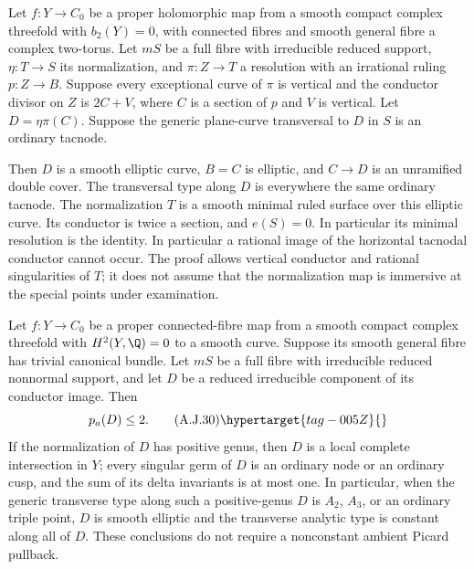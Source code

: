 
\begin{proposition}\hypertarget{tag-01B8}{}\label{cdp:st:A.5.18}


Let $f:Y\to C_0$ be a proper holomorphic map from a smooth
compact complex threefold with $b_2(Y)=0$, with connected
fibres and smooth general fibre a complex two-torus.
Let $mS$ be a full fibre with irreducible reduced support,
$\eta:T\to S$ its normalization, and $\pi:Z\to T$ a
resolution with an irrational ruling $p:Z\to B$.
Suppose every exceptional curve of $\pi$ is vertical and
the conductor divisor on $Z$ is $2C+V$, where $C$ is a
section of $p$ and $V$ is vertical. Let $D=\eta\pi(C)$.
Suppose the generic plane-curve transversal to $D$ in $S$ is an
ordinary tacnode.

Then $D$ is a smooth elliptic curve, $B=C$ is elliptic,
and $C\to D$ is an unramified double cover. The transversal
type along $D$ is everywhere the same ordinary tacnode.
The normalization $T$ is a smooth minimal ruled surface
over this elliptic curve. Its conductor is twice a
section, and $e(S)=0$. In particular its minimal
resolution is the identity.
In particular a rational image of
the horizontal tacnodal conductor cannot occur. The proof
allows vertical conductor and rational singularities of
$T$; it does not assume that the normalization map is
immersive at the special points under examination.
\end{proposition}

\begin{proposition}\hypertarget{tag-01B4}{}\label{cdp:st:A.5.14}


Let $f:Y\to C_0$ be a proper connected-fibre map from a
smooth compact complex threefold with $H^2(Y,\Q)=0$ to
a smooth curve. Suppose its smooth general fibre has
trivial canonical bundle. Let $mS$ be a full fibre with
irreducible reduced nonnormal support, and let $D$ be
a reduced irreducible component of its conductor image.
Then
\[
                         p_a(D)\le2.                \tag{A.J.30}\hypertarget{tag-005Z}{}\label{cdp:eq:A.J.30}
\]
If the normalization of $D$ has positive genus, then
$D$ is a local complete intersection in $Y$; every
singular germ of $D$ is an ordinary node or an ordinary
cusp, and the sum of its delta invariants is at most
one. In particular, when the generic transverse type
along such a positive-genus $D$ is $A_2$, $A_3$, or an
ordinary triple point, $D$ is smooth elliptic and the
transverse analytic type is constant along all of $D$.
These conclusions do not require a nonconstant ambient
Picard pullback.
\end{proposition}


